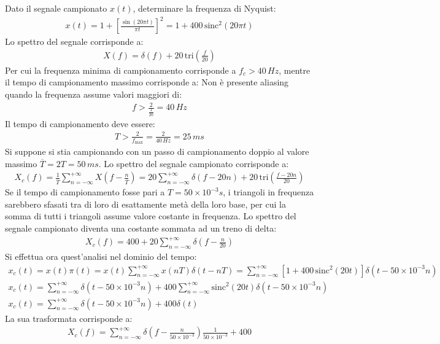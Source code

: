 \documentclass{article}
\newcommand{\sinc}{\mathrm{sinc}}
\newcommand{\tri}{\mathrm{tri}}
\begin{document}
Dato il segnale campionato $x(t)$, determinare la frequenza di Nyquist: 
\begin{gather*}
    x(t)=1+\left[\displaystyle\frac{\sin(20\pi t)}{\pi t}\right]^2=1+400\,\sinc^2\left(20\pi t\right)
\end{gather*}
Lo spettro del segnale corrisponde a:
\begin{gather*}
    X(f)=\displaystyle \delta(f)+20\,\tri \left(\frac{f}{20}\right)
\end{gather*}
Per cui la frequenza minima di campionamento corrisponde a $f_c>40\,Hz$, mentre il tempo di campionamento massimo corrisponde a:
Non è presente aliasing quando la frequenza assume valori maggiori di:
\begin{gather*}
    f>\displaystyle\frac{2}{\frac{1}{20}}=40\,Hz
\end{gather*}
Il tempo di campionamento deve essere:
\begin{gather}
    T>\displaystyle\frac{2}{f_{\max}}=\frac{2}{40\,Hz}=25\,ms
\end{gather}
Si suppone si stia campionando con un passo di campionamento doppio al valore massimo $\overline{T}=2T=50\,ms$. Lo spettro del segnale campionato corrisponde a:
\begin{gather*}
    X_c(f)=\displaystyle \frac{1}{\overline{T}}\sum_{n=-\infty}^{+\infty}X\left(f-\frac{n}{\overline{T}}\right)=20\sum_{n=-\infty}^{+\infty}\delta(f-20n)+20\,\tri \left(\frac{f-20n}{20}\right)
\end{gather*}
Se il tempo di campionamento fosse pari a $T=50\times10^{-3}s$, i triangoli in frequenza sarebbero sfasati tra di loro di esattamente metà della loro base, per cui la 
somma di tutti i triangoli assume valore costante in frequenza. 
Lo spettro del segnale campionato diventa una costante sommata ad un treno di delta:
\begin{gather}
    X_c(f)=400+20\displaystyle\sum_{n=-\infty}^{+\infty}\delta\left(f-\frac{n}{20}\right)
\end{gather}
Si effettua ora quest'analisi nel dominio del tempo:
\begin{gather*}
    x_c(t)=x(t)\pi(t)=x(t)\displaystyle\sum_{n=-\infty}^{+\infty}x(nT)\delta(t-nT)=\sum_{n=-\infty}^{+\infty}\left[1+400\,\sinc^2\left(20t\right)\right]\delta(t-50\times10^{-3}n)\\
    x_c(t)=\displaystyle\sum_{n=-\infty}^{+\infty}\delta(t-50\times10^{-3}n)+400\sum_{n=-\infty}^{+\infty}\sinc^2(20t)\delta(t-50\times10^{-3}n)\\
    x_c(t)=\displaystyle\sum_{n=-\infty}^{+\infty}\delta(t-50\times10^{-3}n)+400\delta(t)
\end{gather*}
La sua trasformata corrisponde a:
\begin{gather}
    X_c(f)=\displaystyle\sum_{n=-\infty}^{+\infty}\delta\left(f-\frac{n}{50\times10^{-3}}\right)\frac{1}{50\times10^{-3}}+400
\end{gather}
\end{document}
